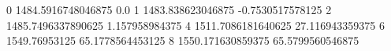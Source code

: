 0 1484.5916748046875 0.0
1 1483.838623046875 -0.7530517578125
2 1485.7496337890625 1.157958984375
4 1511.7086181640625 27.116943359375
6 1549.76953125 65.1778564453125
8 1550.171630859375 65.5799560546875

